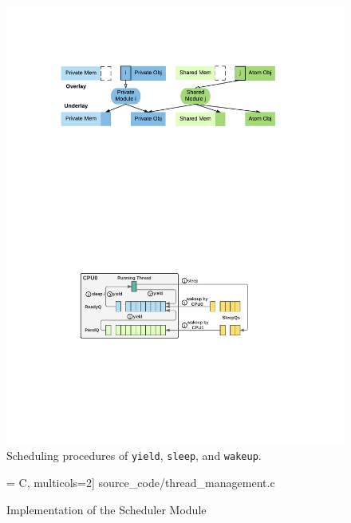 \begin{figure}
\begin{center}
\includegraphics[scale=.72]{figs/scheduler} 
\end{center}
\vspace{-10pt}
\caption{Scheduling procedures of \texttt{yield}, \texttt{sleep},
and \texttt{wakeup}.}
\label{fig:exp:fig:scheduler}
\vspace{-10pt}
\end{figure}

\begin{figure}
 = C, multicols=2] {source_code/thread_management.c}
\caption{Implementation of the Scheduler Module}
\label{fig:exp:scheduler}
\end{figure}

\vspace{-3pt}
